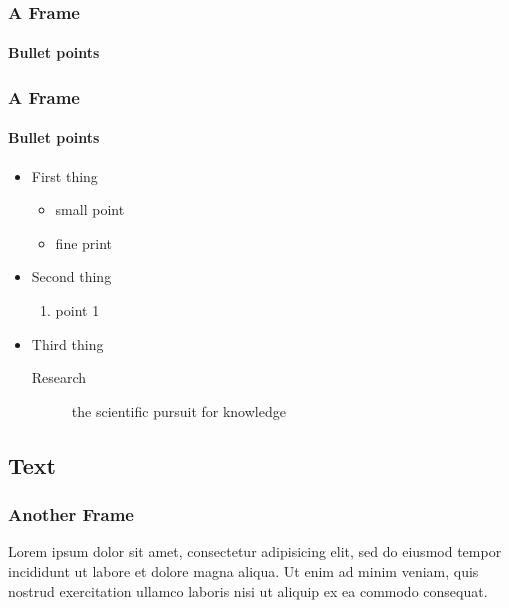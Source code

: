 \begin{frame}[fragile]
\frametitle{A Frame}
\framesubtitle{Bullet points}
\end{frame}

\begin{frame}
\frametitle{A Frame}
\framesubtitle{Bullet points}
\begin{itemize}
\item First thing
	\begin{itemize}
	\item small point
	\item fine print
	\end{itemize}
\item Second thing
	\begin{enumerate}
	\item point 1
	\end{enumerate}
\item Third thing
	\begin{description}
	\item[Research] the scientific pursuit for knowledge
	\end{description}
\end{itemize}
\end{frame}

\subsection{Text}
\begin{frame}
\frametitle{Another Frame}
Lorem ipsum dolor sit amet, consectetur adipisicing elit, sed do eiusmod tempor incididunt ut labore et dolore magna aliqua. Ut enim ad minim veniam, quis nostrud exercitation ullamco laboris nisi ut aliquip ex ea commodo consequat.
\end{frame}

